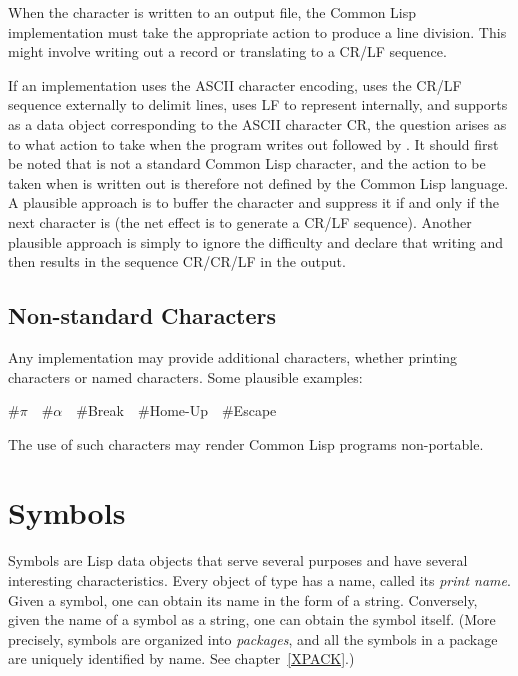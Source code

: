 When the character  is written to an output file,
the Common Lisp implementation must take the appropriate action
to produce a line division.  This might involve writing out a
record or translating  to a CR/LF sequence.

\beforenoterule
\begin{implementation}
If an implementation uses the ASCII character encoding,
uses the CR/LF sequence externally to delimit lines,
uses LF to represent  internally, and supports 
as a data object corresponding to the ASCII character CR, the
question arises as to what action to take when the program
writes out  followed by .
It should first be noted that  is not a standard Common Lisp
character, and the action to be taken when  is written out
is therefore not defined by the Common Lisp language.  A plausible approach
is to buffer the  character and suppress it if and only if the
next character is  (the net effect is to generate a CR/LF
sequence).
Another plausible
approach is simply to ignore
the difficulty and declare that writing  and then
 results in the sequence CR/CR/LF in the output.
\end{implementation}
\afternoterule

\subsection{Non-standard Characters}

Any implementation may provide additional characters, whether printing
characters or named characters.  Some plausible examples:

\begin{lisp}
\#{\Xbackslash}$\pi$~~\#{\Xbackslash}$\alpha$~~\#{\Xbackslash}Break~~\#{\Xbackslash}Home-Up~~\#{\Xbackslash}Escape
\end{lisp}
The use of such characters may render Common Lisp programs non-portable.

\section{Symbols}

Symbols are Lisp data objects that serve several purposes
and have several interesting characteristics.  Every object of
type  has a name,
called its \emph{print name}.  Given a symbol, one can
obtain its name in the form of a string.  Conversely,
given the name of a symbol as a string, one can obtain the
symbol itself.  (More precisely, symbols are organized into
\emph{packages}, and all the symbols in a package are uniquely
identified by name.  See chapter~\ref{XPACK}.)

